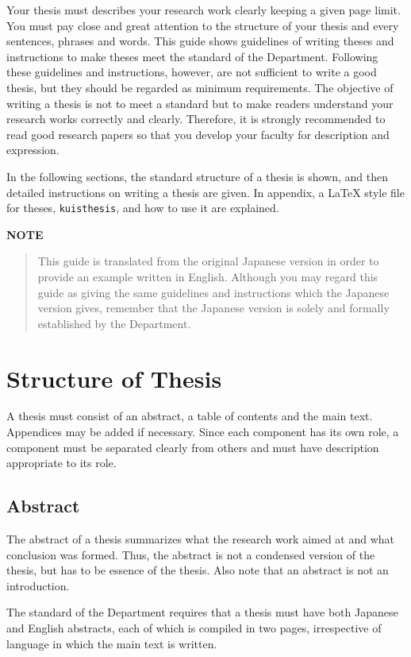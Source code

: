 \documentclass[master,english]{kuisthesis}
\begin{document}
Your thesis must describes your research work clearly keeping a given page
limit.  You must pay close and great attention to the structure of your
thesis and every sentences, phrases and words.  This guide shows guidelines
of writing theses and instructions to make theses meet the standard of the
Department.  Following these guidelines and instructions, however, are not
sufficient to write a good thesis, but they should be regarded as minimum
requirements.  The objective of writing a thesis is not to meet a standard
but to make readers understand your research works correctly and clearly.
Therefore, it is strongly recommended to read good research papers so that
you develop your faculty for description and expression.

In the following sections, the standard structure of a thesis is shown, and
then detailed instructions on writing a thesis are given.  In appendix, a
\LaTeX{} style file for theses, \verb|kuisthesis|, and how to use it are
explained.

\par\bigskip\centerline{\bf NOTE}
\begin{quote}
  This guide is translated from the original Japanese version in order
  to provide an example written in English.  Although you may regard
  this guide as giving the same guidelines and instructions which the
  Japanese version gives, remember that the Japanese version is solely
  and formally established by the Department.
\end{quote}

\section{Structure of Thesis}\label{sec-structure}
A thesis must consist of an abstract, a table of contents and the main text.
Appendices may be added if necessary.  Since each component has its own role,
a component must be separated clearly from others and must have description
appropriate to its role.

\subsection{Abstract}\label{subsec-abstract}
The abstract of a thesis summarizes what the research work aimed at and what
conclusion was formed.  Thus, the abstract is not a condensed version of the
thesis, but has to be essence of the thesis.  Also note that an abstract
is not an introduction.

The standard of the Department requires that a thesis must have both
Japanese and English abstracts, each of which is compiled in two pages,
irrespective of language in which the main text is written.
\end{document}
